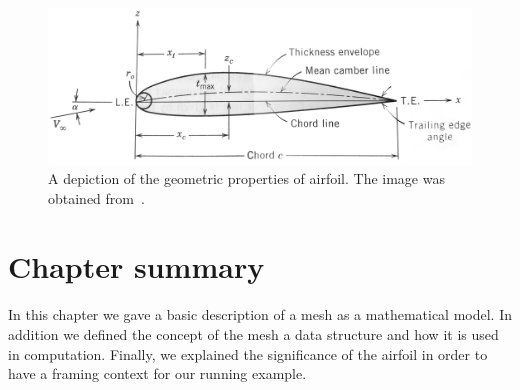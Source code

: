 \begin{figure}
\includegraphics[width=\imagewidth]{images/background/airfoil.png}
    \caption{A depiction of the geometric properties of airfoil. The image was obtained from~\cite{kuethe1986foundations}.}
    \label{fig:airfoil-geometry}
\end{figure}

\section{Chapter summary}
In this chapter we gave a basic description of a mesh as a mathematical model. In addition we defined the concept of the mesh a data structure and how it is used in computation. Finally, we explained the significance of the airfoil in order to have a framing context for our running example.